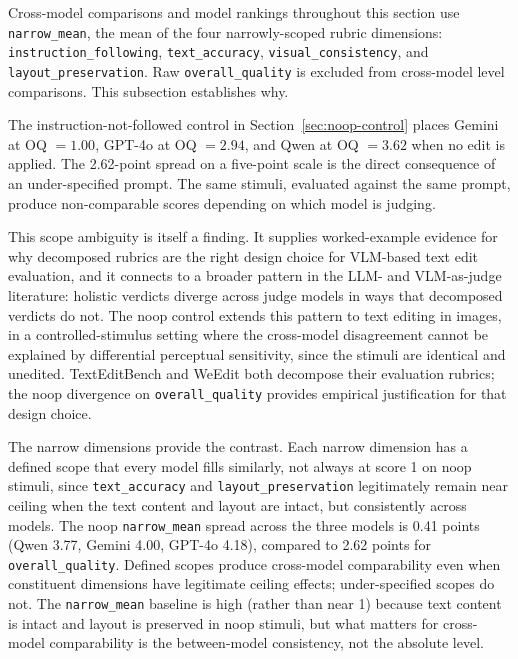 Cross-model comparisons and model rankings throughout this section use \texttt{narrow\_mean}, the mean of the four narrowly-scoped rubric dimensions: \texttt{instruction\_following}, \texttt{text\_accuracy}, \texttt{visual\_consistency}, and \texttt{layout\_preservation}. Raw \texttt{overall\_quality} is excluded from cross-model level comparisons. This subsection establishes why.

The instruction-not-followed control in Section~\ref{sec:noop-control} places Gemini at OQ $= 1.00$, GPT-4o at OQ $= 2.94$, and Qwen at OQ $= 3.62$ when no edit is applied. The 2.62-point spread on a five-point scale is the direct consequence of an under-specified prompt. The same stimuli, evaluated against the same prompt, produce non-comparable scores depending on which model is judging.

This scope ambiguity is itself a finding. It supplies worked-example evidence for why decomposed rubrics are the right design choice for VLM-based text edit evaluation, and it connects to a broader pattern in the LLM- and VLM-as-judge literature: holistic verdicts diverge across judge models in ways that decomposed verdicts do not. %
The noop control extends this pattern to text editing in images, in a controlled-stimulus setting where the cross-model disagreement cannot be explained by differential perceptual sensitivity, since the stimuli are identical and unedited. TextEditBench and WeEdit both decompose their evaluation rubrics; the noop divergence on \texttt{overall\_quality} provides empirical justification for that design choice.

The narrow dimensions provide the contrast. Each narrow dimension has a defined scope that every model fills similarly, not always at score 1 on noop stimuli, since \texttt{text\_accuracy} and \texttt{layout\_preservation} legitimately remain near ceiling when the text content and layout are intact, but consistently across models. The noop \texttt{narrow\_mean} spread across the three models is 0.41 points (Qwen 3.77, Gemini 4.00, GPT-4o 4.18), compared to 2.62 points for \texttt{overall\_quality}. Defined scopes produce cross-model comparability even when constituent dimensions have legitimate ceiling effects; under-specified scopes do not. The \texttt{narrow\_mean} baseline is high (rather than near 1) because text content is intact and layout is preserved in noop stimuli, but what matters for cross-model comparability is the between-model consistency, not the absolute level.

